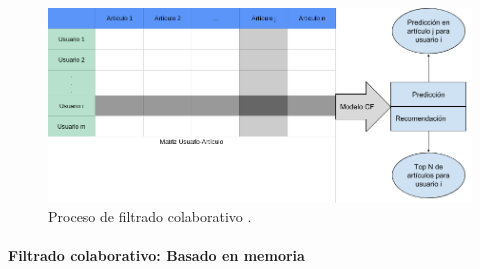 \FloatBarrier
\begin{figure}[htbp!]
		\centering
			\includegraphics[width=.9 \textwidth]{imagenes/filtrado_colavorativo}
		\caption{Proceso de filtrado colaborativo \cite{Isinkaye}. }
		\label{image:filtradocolaborativo}
\end{figure}
\FloatBarrier

\paragraph{Filtrado colaborativo: Basado en memoria} ~\\

